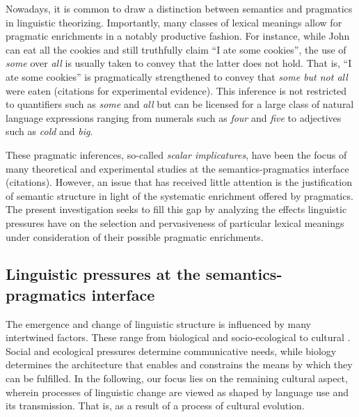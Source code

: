 \documentclass[a4paper]{article}
\newcommand{\hl}[1]{\textcolor[rgb]{.8,.33,.0}{#1}}%
\begin{document}
Nowadays, it is common to draw a distinction between semantics and pragmatics in linguistic theorizing. Importantly, many classes of lexical meanings allow for pragmatic enrichments in a notably productive fashion. For instance, while John can eat all the cookies and still truthfully claim ``I ate some cookies'', the use of {\em some} over {\em all} is usually taken to convey that the latter does not hold. That is, ``I ate some cookies'' is pragmatically strengthened to convey that {\em some but not all} were eaten (\hl{citations for experimental evidence}). This inference is not restricted to quantifiers such as {\em some} and {\em all} but can be licensed for a large class of natural language expressions ranging from numerals such as {\em four} and {\em five} to adjectives such as {\em cold} and {\em big}.

These pragmatic inferences, so-called {\em scalar implicatures}, have been the focus of many theoretical and experimental studies at the semantics-pragmatics interface (\hl{citations}). However, an issue that has received little attention is the justification of semantic structure in light of the systematic enrichment offered by pragmatics. The present investigation seeks to fill this gap by analyzing the effects linguistic pressures have on the selection and pervasiveness of particular lexical meanings under consideration of their possible pragmatic enrichments.

\subsection{Linguistic pressures at the semantics-pragmatics interface}
The emergence and change of linguistic structure is influenced by many intertwined factors. These range from biological and socio-ecological to cultural \citep{steels:2011,tamariz+kirby:2016}. Social and ecological pressures determine communicative needs, while biology determines the architecture that enables and constrains the means by which they can be fulfilled. In the following, our focus lies on the remaining cultural aspect, wherein processes of linguistic change are viewed as shaped by language use and its transmission. That is, as a result of a process of cultural evolution. 
\end{document}
